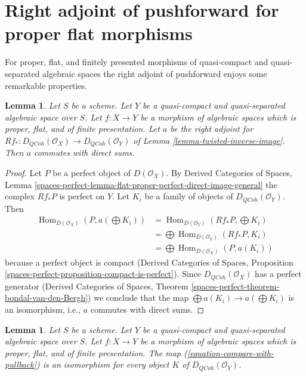 \documentclass{stacks-project}
\theoremstyle{plain}
\newtheorem{lemma}[subsection]{Lemma}
\theoremstyle{definition}
\theoremstyle{remark}
\numberwithin{equation}{subsection}
\def\Hom{\mathop{\mathrm{Hom}}\nolimits}
\def\QCoh{\mathit{QCoh}}
\begin{document}
\section{Right adjoint of pushforward for proper flat morphisms}
\label{section-proper-flat}

\noindent
For proper, flat, and finitely presented morphisms of quasi-compact
and quasi-separated algebraic spaces the right adjoint of pushforward
enjoys some remarkable properties.

\begin{lemma}
\label{lemma-proper-flat}
Let $S$ be a scheme.
Let $Y$ be a quasi-compact and quasi-separated algebraic space over $S$.
Let $f : X \to Y$ be a morphism of algebraic spaces which is proper, flat, and
of finite presentation.
Let $a$ be the right adjoint for
$Rf_* : D_\QCoh(\mathcal{O}_X) \to D_\QCoh(\mathcal{O}_Y)$ of
Lemma \ref{lemma-twisted-inverse-image}. Then $a$ commutes with direct sums.
\end{lemma}

\begin{proof}
Let $P$ be a perfect object of $D(\mathcal{O}_X)$. By
Derived Categories of Spaces, Lemma
\ref{spaces-perfect-lemma-flat-proper-perfect-direct-image-general}
the complex $Rf_*P$ is perfect on $Y$.
Let $K_i$ be a family of objects of $D_\QCoh(\mathcal{O}_Y)$.
Then
\begin{align*}
\Hom_{D(\mathcal{O}_X)}(P, a(\bigoplus K_i))
& =
\Hom_{D(\mathcal{O}_Y)}(Rf_*P, \bigoplus K_i) \\
& =
\bigoplus \Hom_{D(\mathcal{O}_Y)}(Rf_*P, K_i) \\
& =
\bigoplus \Hom_{D(\mathcal{O}_X)}(P, a(K_i))
\end{align*}
because a perfect object is compact (Derived Categories of Spaces,
Proposition \ref{spaces-perfect-proposition-compact-is-perfect}).
Since $D_\QCoh(\mathcal{O}_X)$ has a perfect generator
(Derived Categories of Spaces, Theorem
\ref{spaces-perfect-theorem-bondal-van-den-Bergh})
we conclude that the map $\bigoplus a(K_i) \to a(\bigoplus K_i)$
is an isomorphism, i.e., $a$ commutes with direct sums.
\end{proof}

\begin{lemma}
\label{lemma-compare-with-pullback-flat-proper}
Let $S$ be a scheme.
Let $Y$ be a quasi-compact and quasi-separated algebraic space over $S$.
Let $f : X \to Y$ be a morphism of algebraic spaces which is proper, flat, and
of finite presentation.
The map (\ref{equation-compare-with-pullback}) is an isomorphism
for every object $K$ of $D_\QCoh(\mathcal{O}_Y)$.
\end{lemma}
\end{document}
